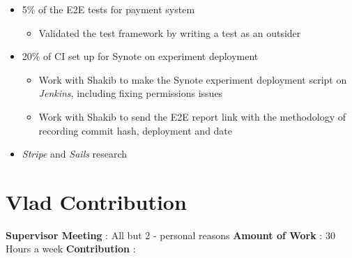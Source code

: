 \begin{itemize}
	\item 5\% of the E2E tests for payment system
		\begin{itemize}
			\item Validated the test framework by writing a test as an outsider
		\end{itemize}
	\item 20\% of CI set up for Synote on experiment deployment
		\begin{itemize}
			\item Work with Shakib to make the Synote experiment deployment script on \textit{Jenkins}, including fixing permissions issues
			\item Work with Shakib to send the E2E report link with the methodology of recording commit hash, deployment and date
		\end{itemize}
	\item \textit{Stripe} and \textit{Sails} research
\end{itemize}

\section{Vlad Contribution}
\label{sec:vlad-contribution}
\textbf{Supervisor Meeting} : All but 2 - personal reasons
\newline
\textbf{Amount of Work} : 30 Hours a week
\newline
\textbf{Contribution} :

